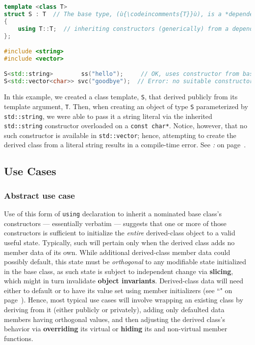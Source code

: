\begin{lstlisting}[language=C++]
template <class T>
struct S : T  // The base type, (ù{\codeincomments{T}}ù), is a *dependent type*.
{
    using T::T;  // inheriting constructors (generically) from a dependent type
};

#include <string>
#include <vector>

S<std::string>        ss("hello");     // OK, uses constructor from base
S<std::vector<char>> svc("goodbye");  // Error: no suitable constructor in base
\end{lstlisting}

\noindent In this example, we created a class template, \texttt{S}, that
derived publicly from its template argument, \texttt{T}. Then, when
creating an object of type \texttt{S} parameterized by
\texttt{std::string}, we were able to pass it a string literal via
the inherited \texttt{std::string} constructor overloaded on a
\texttt{const}~\texttt{char*}. Notice, however, that no such constructor
is available in \texttt{std::vector}; hence, attempting to create the
derived class from a literal string results in a compile-time error. See \textit{: } on page~\pageref{incorporating-reusable-functionality-via-a-mix-in-class}.

\subsection[Use Cases]{Use Cases}\label{use-cases-ctorinheriting}

\subsubsection[Abstract use case]{Abstract use case}\label{abstract-use-case}

Use of this form of \texttt{using} declaration to inherit a nominated
base class's constructors --- essentially verbatim --- suggests that one
or more of those constructors is sufficient to initialize the
\emph{entire} derived-class object to a valid useful state. Typically,
such will pertain only when the derived class adds no member data of its
own. While additional derived-class member data could possibly
default, this state must be \emph{orthogonal} to
any modifiable state initialized in the base class, as such state is
subject to independent change via \textbf{slicing}, which might in turn
invalidate \textbf{object invariants}. Derived-class data will need either
to default or to have its value set using member
initializers (see ``" on page~\pageref{Default-Member-Initializers}). Hence, most typical use cases will involve wrapping an
existing class by deriving from it (either publicly or privately),
adding only defaulted data members having orthogonal values, and then
adjusting the derived class's behavior via \textbf{overriding} its virtual
or \textbf{hiding} its and non-virtual member functions.

